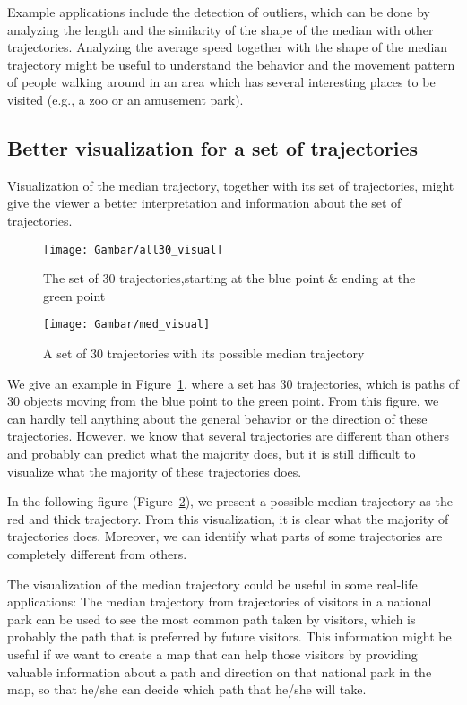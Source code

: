 Example applications include the detection of outliers, which can be done by analyzing the length and the similarity of the shape of the median with other trajectories.
Analyzing the average speed together with the shape of the median trajectory might be useful to understand the behavior and the movement pattern of people walking around in an area which has several interesting places to be visited (e.g., a zoo or an amusement park). 

\subsection{Better visualization for a set of trajectories}
Visualization of the median trajectory, together with its set of trajectories, might give the viewer a better interpretation and information about the set of trajectories.

\begin{figure}
\centering
\texttt{[image: Gambar/all30\_visual]}
\caption[The set of 30 trajectories, starting at the blue point \& ending at the green point]{The set of 30 trajectories,starting at the blue point \& ending at the green point} 
\label{fig:all30_visual}
\end{figure}

\begin{figure}
\centering
\texttt{[image: Gambar/med\_visual]}
\caption[A set of 30 trajectories with its possible median trajectory]{A set of 30 trajectories with its possible median trajectory} 
\label{fig:med_visual}
\end{figure}

We give an example in Figure~\ref{fig:all30_visual}, where a set has 30 trajectories, which is paths of 30 objects moving from the blue point to the green point.
From this figure, we can hardly tell anything about the general behavior or the direction of these trajectories. 
However, we know that several trajectories are different than others and probably can predict what the majority does, but it is still difficult to visualize what the majority of these trajectories does.

In the following figure (Figure~\ref{fig:med_visual}), we present a possible median trajectory as the red and thick trajectory.
From this visualization, it is clear what the majority of trajectories does.
Moreover, we can identify what parts of some trajectories are completely different from others. 

The visualization of the median trajectory could be useful in some real-life applications:
The median trajectory from trajectories of visitors in a national park can be used to see the most common path taken by visitors, which is probably the path that is preferred by future visitors.
This information might be useful if we want to create a map that can help those visitors by providing valuable information about a path and direction on that national park in the map, so that he/she can decide which path that he/she will take. 

